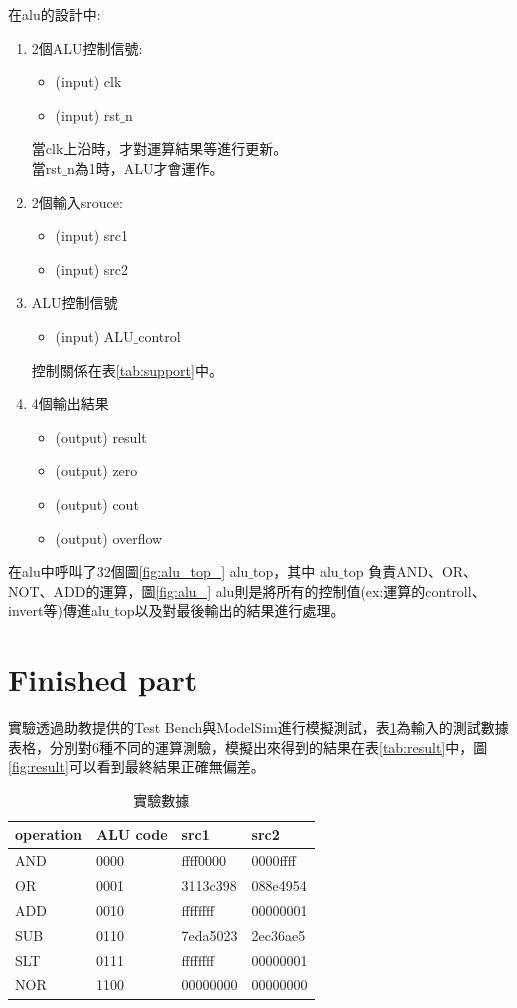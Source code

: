 \documentclass[12pt,a4paper]{article}
\theoremstyle{definition}
\begin{document}
在alu的設計中:
\begin{enumerate}
\item 2個ALU控制信號:
\begin{itemize}
\item (input) clk
\item (input) rst$\_$n
\end{itemize}
當clk上沿時，才對運算結果等進行更新。\\
當rst$\_$n為1時，ALU才會運作。

\item 2個輸入srouce:
\begin{itemize}
\item (input) src1
\item (input) src2
\end{itemize}

\item ALU控制信號
\begin{itemize}
\item (input) ALU$\_$control
\end{itemize}
控制關係在表\ref{tab:support}中。

\item 4個輸出結果
\begin{itemize}
\item (output) result
\item (output) zero
\item (output) cout
\item (output) overflow
\end{itemize}
\end{enumerate}

在alu中呼叫了32個圖\ref{fig:alu_top_} alu$\_$top，其中 alu$\_$top 負責AND、OR、NOT、ADD的運算，圖\ref{fig:alu_} alu則是將所有的控制值(ex:運算的controll、invert等)傳進alu$\_$top以及對最後輸出的結果進行處理。

\section{Finished part}

實驗透過助教提供的Test Bench與ModelSim進行模擬測試，表\ref{tab:data}為輸入的測試數據表格，分別對6種不同的運算測驗，模擬出來得到的結果在表\ref{tab:result}中，圖\ref{fig:result}可以看到最終結果正確無偏差。
\begin{table}[H]
\centering
\caption
{實驗數據}
\label{tab:data}
\begin{tabular}{llll} \toprule
operation & ALU code & src1 & src2 \\
\midrule
AND & 0000 & ffff0000 & 0000ffff
\\
OR & 0001 & 3113c398 & 088e4954
\\
ADD & 0010 & ffffffff & 00000001
\\
SUB & 0110 & 7eda5023 & 2ec36ae5
\\
SLT & 0111 & ffffffff & 00000001
\\
NOR & 1100 & 00000000 & 00000000
\\ \bottomrule
\end{tabular}
\end{table}
\end{document}
